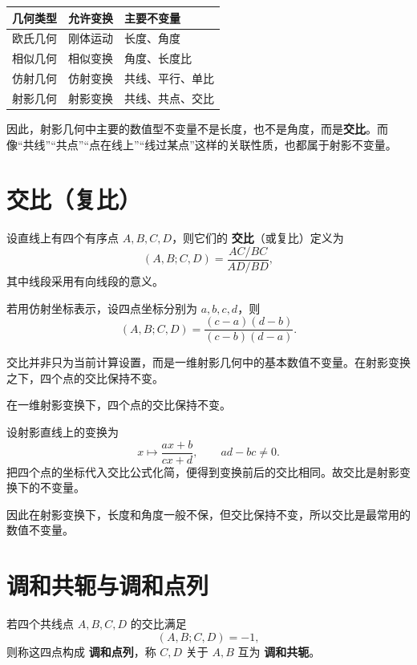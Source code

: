 \begin{center}
\begin{tabular}{>{\centering\arraybackslash}m{3cm}>{\centering\arraybackslash}m{4cm}>{\centering\arraybackslash}m{5cm}}
\hline
几何类型 & 允许变换 & 主要不变量 \\
\hline
欧氏几何 & 刚体运动 & 长度、角度 \\
相似几何 & 相似变换 & 角度、长度比 \\
仿射几何 & 仿射变换 & 共线、平行、单比 \\
射影几何 & 射影变换 & 共线、共点、交比 \\
\hline
\end{tabular}
\end{center}

因此，射影几何中主要的数值型不变量不是长度，也不是角度，而是\textbf{交比}。而像“共线”“共点”“点在线上”“线过某点”这样的关联性质，也都属于射影不变量。

\section{交比（复比）}
\begin{definition}
设直线上有四个有序点 $A,B,C,D$，则它们的 \textbf{交比}（或复比）定义为
\[
(A,B;C,D)=\frac{AC/BC}{AD/BD},
\]
其中线段采用有向线段的意义。
\end{definition}

若用仿射坐标表示，设四点坐标分别为 $a,b,c,d$，则
\[
(A,B;C,D)=\frac{(c-a)(d-b)}{(c-b)(d-a)}.
\]

交比并非只为当前计算设置，而是一维射影几何中的基本数值不变量。在射影变换之下，四个点的交比保持不变。

\begin{theorem}
在一维射影变换下，四个点的交比保持不变。
\end{theorem}

\begin{myproof}
设射影直线上的变换为
\[
x\longmapsto \frac{ax+b}{cx+d},\qquad ad-bc\neq 0.
\]
把四个点的坐标代入交比公式化简，便得到变换前后的交比相同。故交比是射影变换下的不变量。
\end{myproof}

因此在射影变换下，长度和角度一般不保，但交比保持不变，所以交比是最常用的数值不变量。

\section{调和共轭与调和点列}
\begin{definition}
若四个共线点 $A,B,C,D$ 的交比满足
\[
(A,B;C,D)=-1,
\]
则称这四点构成 \textbf{调和点列}，称 $C,D$ 关于 $A,B$ 互为 \textbf{调和共轭}。
\end{definition}

